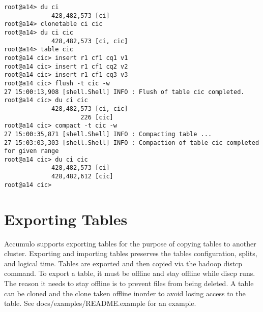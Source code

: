 \small
\begin{verbatim}
root@a14> du ci           
             428,482,573 [ci]
root@a14> clonetable ci cic
root@a14> du ci cic
             428,482,573 [ci, cic]
root@a14> table cic
root@a14 cic> insert r1 cf1 cq1 v1
root@a14 cic> insert r1 cf1 cq2 v2
root@a14 cic> insert r1 cf1 cq3 v3 
root@a14 cic> flush -t cic -w 
27 15:00:13,908 [shell.Shell] INFO : Flush of table cic completed.
root@a14 cic> du ci cic       
             428,482,573 [ci, cic]
                     226 [cic]
root@a14 cic> compact -t cic -w
27 15:00:35,871 [shell.Shell] INFO : Compacting table ...
27 15:03:03,303 [shell.Shell] INFO : Compaction of table cic completed for given range
root@a14 cic> du ci cic        
             428,482,573 [ci]
             428,482,612 [cic]
root@a14 cic> 
\end{verbatim}
\normalsize

\section{Exporting Tables}

Accumulo supports exporting tables for the purpose of copying tables to another
cluster.  Exporting and importing tables preserves the tables configuration,
splits, and logical time.  Tables are exported and then copied via the hadoop
distcp command.  To export a table, it must be offline and stay offline while
discp runs.  The reason it needs to stay offline is to prevent files from being
deleted.  A table can be cloned and the clone taken offline inorder to avoid
losing access to the table.  See docs/examples/README.example for an example.
